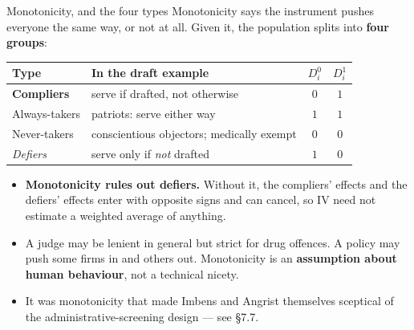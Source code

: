 \documentclass[
  11pt,
  ignorenonframetext,
  aspectratio=169,
]{beamer}
\providecommand{\tightlist}{%
  \setlength{\itemsep}{0pt}\setlength{\parskip}{0pt}}
\begin{document}
\begin{frame}{Monotonicity, and the four types}
\protect{}\label{monotonicity-and-the-four-types}
Monotonicity says the instrument pushes everyone the same way, or not at
all. Given it, the population splits into \textbf{four groups}:

\begin{center}
\small
\begin{tabular}{llcc}
\toprule
Type & In the draft example & $D^0_i$ & $D^1_i$ \\
\midrule
\textbf{Compliers}    & serve if drafted, not otherwise        & $0$ & $1$ \\
Always-takers         & patriots: serve either way             & $1$ & $1$ \\
Never-takers          & conscientious objectors; medically exempt & $0$ & $0$ \\
\textit{Defiers}      & serve only if \emph{not} drafted        & $1$ & $0$ \\
\bottomrule
\end{tabular}
\end{center}

\begin{itemize}
\tightlist
\item
  \textbf{Monotonicity rules out defiers.} Without it, the compliers'
  effects and the defiers' effects enter with opposite signs and can
  cancel, so IV need not estimate a weighted average of anything.
\item
  A judge may be lenient in general but strict for drug offences. A
  policy may push some firms in and others out. Monotonicity is an
  \textbf{assumption about human behaviour}, not a technical nicety.
\item
  It was monotonicity that made Imbens and Angrist themselves sceptical
  of the administrative-screening design --- see §7.7.
\end{itemize}
\end{frame}
\end{document}
